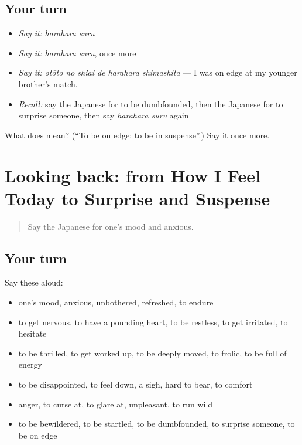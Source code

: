\subsection*{Your turn}
\begin{itemize}
\raggedright
  \item \emph{Say it:} \emph{harahara suru}
  \item \emph{Say it:} \emph{harahara suru}, once more
  \item \emph{Say it:} \emph{otōto no shiai de harahara shimashita} — I was on edge at my younger brother's match.
  \item \emph{Recall:} say the Japanese for to be dumbfounded, then the Japanese for to surprise someone, then say \emph{harahara suru} again
\end{itemize}

\begin{tcolorbox}[breakable,colback=teal!4,colframe=teal!35!black,title={Before you move on}]
What does  mean? (\textquotedblleft{}To be on edge; to be in suspense\textquotedblright{}.) Say it once more.
\end{tcolorbox}
\section[(dialogue)]{Looking back: from How I Feel Today to Surprise and Suspense}

\label{lesson:JA-R431-review-426-431}



\begin{quote}
Say the Japanese for one's mood and anxious.
\end{quote}

\subsection*{Your turn}
Say these aloud:

\begin{itemize}
\raggedright
  \item one's mood, anxious, unbothered, refreshed, to endure
  \item to get nervous, to have a pounding heart, to be restless, to get irritated, to hesitate
  \item to be thrilled, to get worked up, to be deeply moved, to frolic, to be full of energy
  \item to be disappointed, to feel down, a sigh, hard to bear, to comfort
  \item anger, to curse at, to glare at, unpleasant, to run wild
  \item to be bewildered, to be startled, to be dumbfounded, to surprise someone, to be on edge
\end{itemize}

